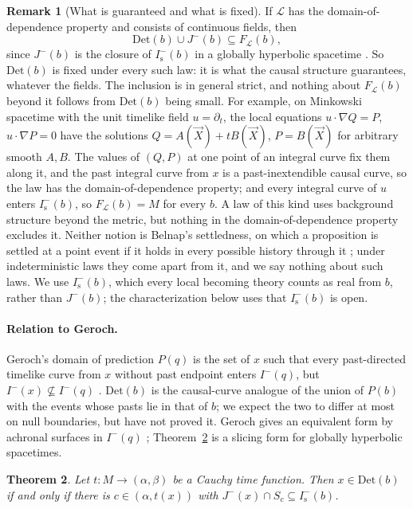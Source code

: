 \documentclass[11pt]{article}
\newtheorem{theorem}{Theorem}
\theoremstyle{definition}
\newtheorem{remark}[theorem]{Remark}
\newcommand{\Is}{I^-_{\mathrm s}}
\newcommand{\Det}{\mathrm{Det}}
\begin{document}
\begin{remark}[What is guaranteed and what is fixed]\label{rem:laws}
If $\mathcal L$ has the domain-of-dependence property and consists of
continuous fields, then
\[\Det(b)\cup J^-(b)\subseteq F_{\mathcal L}(b),\]
since $J^-(b)$ is the closure of $\Is(b)$ in a globally hyperbolic spacetime
\citep{MS2008}. So $\Det(b)$ is fixed under every such law: it is what the
causal structure guarantees, whatever the fields. The inclusion is in general
strict, and nothing about $F_{\mathcal L}(b)$ beyond it follows from $\Det(b)$
being small. For example, on Minkowski spacetime with the unit timelike
field $u=\partial_t$, the local equations $u\cdot\nabla Q=P$,
$u\cdot\nabla P=0$ have the solutions $Q=A(\vec X)+tB(\vec X)$, $P=B(\vec X)$
for arbitrary smooth $A,B$. The values of $(Q,P)$ at one point of an integral curve fix them along
it, and the past integral curve from $x$ is a past-inextendible causal curve,
so the law has the domain-of-dependence property; and every integral curve
of $u$ enters $\Is(b)$, so $F_{\mathcal L}(b)=M$ for every $b$. A law of this
kind uses background structure beyond the metric, but nothing in the
domain-of-dependence property excludes it. Neither notion is Belnap's
settledness, on which a proposition is settled at a point event if it holds
in every possible history through it \citep{Belnap1992}; under
indeterministic laws they come apart from it, and we say nothing about such
laws. We use $\Is(b)$, which every local becoming theory counts as real from
$b$, rather than $J^-(b)$; the characterization below uses that $\Is(b)$ is
open.
\end{remark}

\paragraph{Relation to Geroch.} Geroch's domain of prediction $P(q)$ is the set
of $x$ such that every past-directed timelike curve from $x$ without past
endpoint enters $I^-(q)$, but $I^-(x)\not\subseteq I^-(q)$ \citep[sec.~3]{Geroch1977}.
$\Det(b)$ is the causal-curve analogue of the union of $P(b)$ with the
events whose pasts lie in that of $b$; we expect the two to differ at most
on null boundaries, but have not proved it. Geroch gives an equivalent form by achronal surfaces in $I^-(q)$
\citep[sec.~3]{Geroch1977}; Theorem~\ref{thm:char} is a slicing form for
globally hyperbolic spacetimes.

\begin{theorem}\label{thm:char}
Let $t:M\to(\alpha,\beta)$ be a Cauchy time function. Then $x\in\Det(b)$ if
and only if there is $c\in(\alpha,t(x))$ with $J^-(x)\cap S_c\subseteq\Is(b)$.
\end{theorem}
\end{document}
